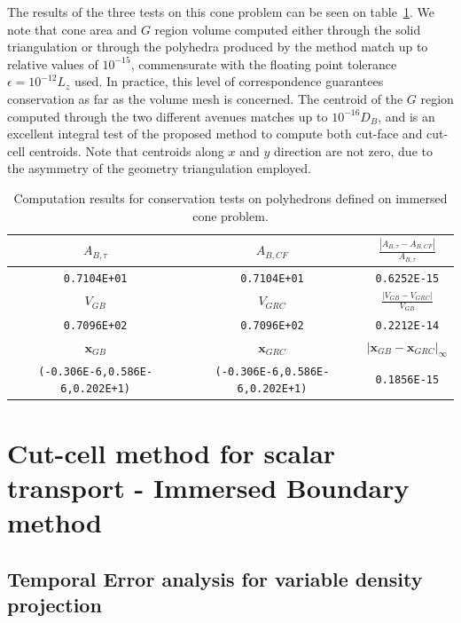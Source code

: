 \documentclass[11pt]{book}
\begin{document}
The results of the three tests on this cone problem can be seen on table~\ref{tab:cone_res}. We note that cone area and $G$ region volume computed either through the solid triangulation or through the polyhedra produced by the method match up to relative values of $10^{-15}$, commensurate with the floating point tolerance $\epsilon=10^{-12}L_z$ used. In practice, this level of correspondence guarantees conservation as far as the volume mesh is concerned. The centroid of the $G$ region computed through the two different avenues matches up to $10^{-16}D_B$, and is an excellent integral test of the proposed method to compute both cut-face and cut-cell centroids. Note that centroids along $x$ and $y$ direction are not zero, due to the asymmetry of the geometry triangulation employed.

%
\begin{table}[h]
  \begin{tabular}{c|c|c}
    \hline \hline
      $A_{B,\tau}$ & $A_{B,CF}$ & $\frac{|A_{B,\tau}-A_{B,CF} |}{A_{B,\tau}}$ \\ \hline
       \texttt{0.7104E+01} & \texttt{0.7104E+01} & \texttt{0.6252E-15} \\
    \hline \hline
      $V_{GB}$ & $V_{GRC}$ & $\frac{|V_{GB}-V_{GRC}|}{V_{GB}}$ \\  \hline
      \texttt{0.7096E+02} & \texttt{0.7096E+02} & \texttt{0.2212E-14} \\
    \hline \hline
    $\mathbf{x}_{GB}$ & $\mathbf{x}_{GRC}$ & $|\mathbf{x}_{GB}-\mathbf{x}_{GRC}|_\infty$ \\
    \hline \hline
    \texttt{(-0.306E-6,0.586E-6,0.202E+1)} &
    \texttt{(-0.306E-6,0.586E-6,0.202E+1)} &
    \texttt{0.1856E-15} \\
    \hline
  \end{tabular}
  \caption{Computation results for conservation tests on polyhedrons defined on immersed cone problem.}
  \label{tab:cone_res}
\end{table}
%


\section{Cut-cell method for scalar transport - Immersed Boundary method}

\subsection{Temporal Error analysis for variable density projection}
\end{document}
